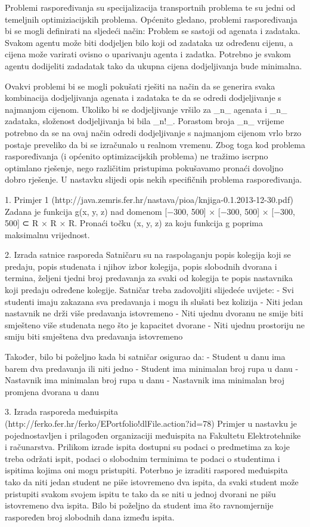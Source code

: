 Problemi raspoređivanja su specijalizacija transportnih problema te su jedni od temeljnih optimiziacijskih problema.
Općenito gledano, problemi raspoređivanja bi se mogli definirati na sljedeći način:
Problem se sastoji od agenata i zadataka. Svakom agentu može biti dodjeljen bilo koji od zadataka uz određenu cijenu, a cijena
može varirati ovisno o uparivanju agenta i zadatka. Potrebno je svakom agentu dodijeliti zadadatak tako da ukupna cijena dodjeljivanja
bude minimalna.

Ovakvi problemi bi se mogli pokušati rješiti na način da se generira svaka kombinacija dodjeljivanja agenata i zadataka te da se
odredi dodjeljivanje s najmanjom cijenom. Ukoliko bi se dodjeljivanje vršilo za _n_ agenata i _n_ zadataka, složenost dodjeljivanja bi bila
_n!_. Porastom broja _n_ vrijeme potrebno da se na ovaj način odredi dodjeljivanje s najmanjom cijenom vrlo brzo postaje preveliko da bi se
izračunalo u realnom vremenu. Zbog toga kod problema raspoređivanja (i općenito optimizacijskih problema) ne tražimo iscrpno optimlano rješenje,
nego različitim pristupima pokušavamo pronaći dovoljno dobro rješenje. U nastavku slijedi opis nekih specifičnih problema raspoređivanja.

1. Primjer 1 (http://java.zemris.fer.hr/nastava/pioa/knjiga-0.1.2013-12-30.pdf)
Zadana je funkcija g(x, y, z) nad domenom [−300, 500] × [−300, 500] × [−300, 500] ⊂
R × R × R. Pronaći točku (x, y, z) za koju funkcija g poprima maksimalnu vrijednost.

2. Izrada satnice rasporeda
Satničaru su na raspolaganju popis kolegija koji se predaju, popis studenata i njihov izbor kolegija, popis slobodnih dvorana i termina,
željeni tjedni broj predavanja za svaki od kolegija te popis nastavnika koji predaju određene kolegije. Satničar treba zadovoljiti
slijedeće uvijete:
  - Svi studenti imaju zakazana sva predavanja i mogu ih slušati bez kolizija
  - Niti jedan nastavnik ne drži više predavanja istovremeno
  - Niti ujednu dvoranu ne smije biti smješteno više studenata nego što je kapacitet dvorane
  - Niti ujednu prostoriju ne smiju biti smještena dva predavanja istovremeno

Također, bilo bi poželjno kada bi satničar osigurao da:
  - Student u danu ima barem dva predavanja ili niti jedno
  - Student ima minimalan broj rupa u danu
  - Nastavnik ima minimalan broj rupa u danu
  - Nastavnik ima minimalan broj promjena dvorana u danu



3. Izrada rasporeda međuispita (http://ferko.fer.hr/ferko/EPortfolio!dlFile.action?id=78)
Primjer u nastavku je pojednostavljen i prilagođen organizaciji međuispita na Fakultetu Elektrotehnike i računarstva.
Prilikom izrade ispita dostupni su podaci o predmetima za koje treba održati ispit, podaci o slobodnim terminima te
podaci o studentima i ispitima kojima oni mogu pristupiti. Poterbno je izraditi raspored međuispita tako da niti jedan
student ne piše istovremeno dva ispita, da svaki student može pristupiti svakom svojem ispitu
te tako da se niti u jednoj dvorani ne pišu istovremeno dva ispita. Bilo bi poželjno
da student ima što ravnomjernije raspoređen broj slobodnih dana između ispita.

